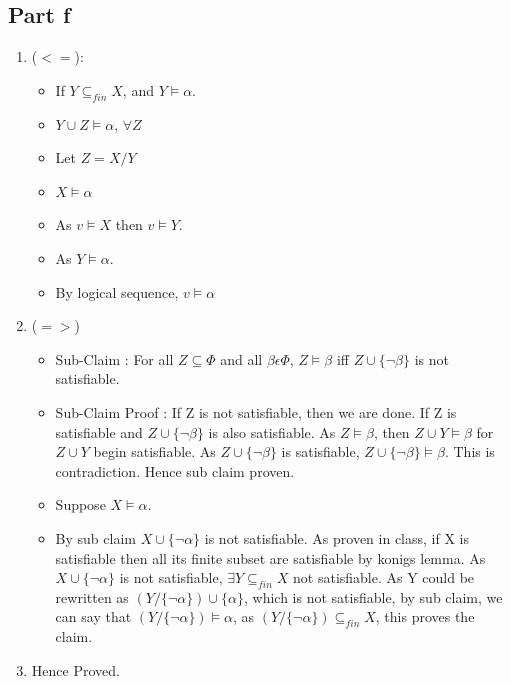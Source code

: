 \documentclass[12pt]{scrartcl}
\begin{document}
\subsection{Part f}
\begin{enumerate}
    \item ($<=$):
    \begin{itemize}
        \item If $Y \subseteq_{fin} X$, and $Y \models \alpha$.
        \item $Y \cup Z \models \alpha$, $\forall Z$
        \item Let $Z = X/Y$
        \item $X \models \alpha$
        \item As $v \models X$ then $v \models Y$.
        \item As $Y \models \alpha$.
        \item By logical sequence, $v \models \alpha$
    \end{itemize}
    \item ($=>$)
    \begin{itemize}
        \item Sub-Claim : For all $Z \subseteq \Phi$ and all $\beta \epsilon \Phi$, $Z \models \beta$ iff $Z \cup \{\neg \beta\}$ is not satisfiable.
        \item Sub-Claim Proof : If Z is not satisfiable, then we are done. If Z is satisfiable and $Z \cup \{\neg \beta\}$ is also satisfiable. As $Z \models \beta$, then $Z \cup Y \models \beta$ for $Z \cup Y$ begin satisfiable. As $Z \cup \{\neg \beta\}$ is satisfiable,  $Z \cup \{\neg \beta\} \models \beta$. This is contradiction. Hence sub claim proven.
        \item Suppose $X \models \alpha$.
        \item By sub claim $X \cup \{\neg \alpha\}$ is not satisfiable. As proven in class, if X is satisfiable then all its finite subset are satisfiable by konigs lemma. As $X \cup \{\neg \alpha\}$ is not satisfiable, $\exists Y \subseteq_{fin} X$ not satisfiable. As Y could be rewritten as $(Y/\{\neg \alpha\}) \cup \{\alpha\}$, which is not satisfiable, by sub claim, we can say that $(Y/\{\neg \alpha\}) \models \alpha$, as $(Y/\{\neg \alpha\}) \subseteq_{fin} X$, this proves the claim.
    \end{itemize}
    \item  Hence Proved.
\end{enumerate}
\end{document}
